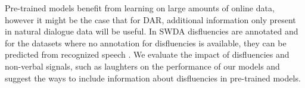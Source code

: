 \documentclass[11pt,a4paper,headings=standardclasses]{article}
\begin{document}
  Pre-trained models benefit from learning on large amounts of online data, however it might be the case that for DAR, additional information only present in natural dialogue data will be useful. In SWDA disfluencies are annotated and for the datasets where no annotation for disfluencies is available, they can be predicted from recognized speech \citep{hough2017joint,shalyminov2018multi}. We evaluate the impact of disfluencies and non-verbal signals, such as laughters on the performance of our models and suggest the ways to include information about disfluencies in pre-trained models. 


{}

\end{document}
